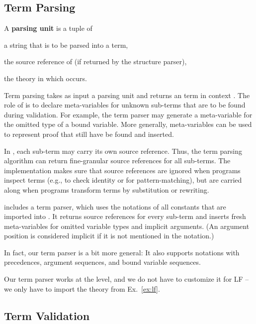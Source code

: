 \subsection{Term Parsing}\label{sec:tp}

A \textbf{parsing unit} is a tuple of
\begin{inparaenum}
	\item a string  that is to be parsed into a term,
	\item the source reference  of  (if returned by the structure parser),
	\item the theory  in which  occurs.
\end{inparaenum}
Term parsing takes as input a parsing unit and returns an \mmt term  in context .
The role of  is to declare meta-variables for unknown sub-terms that are to be found during validation.
For example, the term parser may generate a meta-variable for the omitted type of a bound variable.
More generally, meta-variables can be used to represent proof that still have be found and inserted.

In \mmt, each sub-term may carry its own source reference.
Thus, the term parsing algorithm can return fine-granular source references for all sub-terms.
The \mmt implementation makes sure that source references are ignored when programs inspect terms (e.g., to check identity or for pattern-matching), but are carried along when programs transform terms by substitution or rewriting.

\begin{example}
\jmmt includes a term parser, which uses the \mmt notations of all constants that are imported into .
It returns source references for every sub-term and inserts fresh meta-variables for omitted variable types and implicit arguments.
(An argument position is considered implicit if it is not mentioned in the notation.)

In fact, our term parser is a bit more general: It also supports notations with precedences, argument sequences, and bound variable sequences.

Our term parser works at the \mmt level, and we do not have to customize it for LF -- we only have to import the theory from Ex.~\ref{ex:lf}.
\end{example}





\subsection{Term Validation}\label{sec:tv}

